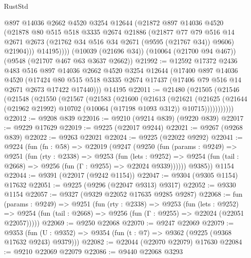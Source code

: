 \begin{lexlean}{RustStd}
\begin{coremodule}
            @897
            @14036
            @2662
            @4520
            @3254
            @12644
            (@21872
              @897
              @14036
              @4520
              (@21878
                @80
                @515
                @518
                @3335
                @2674
                @21886
                (@21877
                  @77
                  @79
                  @516
                  @14
                  @2671
                  @2673
                  (@21762 @34 @516 @34 @2671 (@9595 (@21767 @34)) @9606)
                  @21904)))
            @14195))))
    (@10039 (@21696 @34))
    (@10064 (@21700 @94 @467))
    (@9548 (@21707 @467 @63 @3637 @2662))
@21992 := @12592
    @17372
    @2436
    @483
    @516
    @897
    @14036
    @2662
    @4520
    @3254
    @12644
    (@17400
      @897
      @14036
      @4520
      (@17424 @80 @515 @518 @3335 @2674 @17437 (@17406 @79 @516 @14 @2671 @2673 @17422 @17440)))
    @14195
@22011 := @21480
    (@21505
      (@21546
        (@21548
          (@21550
            (@21567
              (@21583
                (@21600
                  (@21613
                    (@21621
                      (@21625
                        (@21644
                          (@21962 @21992)
                          @10702
                          (@10064 (@17198 @1093 @312))
                          @10715)))))))))))
@22012 := @9208 @839
@22016 := @9210 (@9214 @839) (@9220 @839)
@22017 := @9229 @17629
@22019 := @9225 (@22017 @9244)
@22021 := @9267 (@9268 @839)
@22022 := @9263 @22021
@22024 := @9225 (@22022 @9292)
@22041 := @9224
    (fun (fn : @58) =>
    @22019
      (@9247
        (@9250
          (fun (params : @9249) =>
          @9251
            (fun (rty : @2338) =>
            @9253
              (fun (lets : @9252) =>
              @9254 (fun (tail : @2668) => @9256 (fun (Γ : @9255) => @22024 @9339))))))
        @9385))
    @1154
@22044 := @9391 (@22017 (@9242 @1154))
@22047 := @9304 (@9305 @1154) @17632
@22051 := @9225 (@9296 (@22047 @9313) @9317)
@22052 := @9330 @1154
@22057 := @9327 (@9329 @22052 @17635 @9285 @9287)
@22068 := fun (params : @9249) =>
  @9251
    (fun (rty : @2338) =>
    @9253
      (fun (lets : @9252) =>
      @9254 (fun (tail : @2668) => @9256 (fun (Γ : @9255) => @22024 (@22051 @22057)))))
@22069 := @9250 @22068
@22070 := @9247 @22069
@22079 := @9353
    (fun (U : @9352) => @9354 (fun (t : @7) => @9362 (@9225 (@9368 @17632 @9243) @9379)))
@22082 := @22044 (@22070 @22079) @17630
@22084 := @9210 @22069 @22079
@22086 := @9440 @22068 @3293

\end{coremodule}
\end{lexlean}
